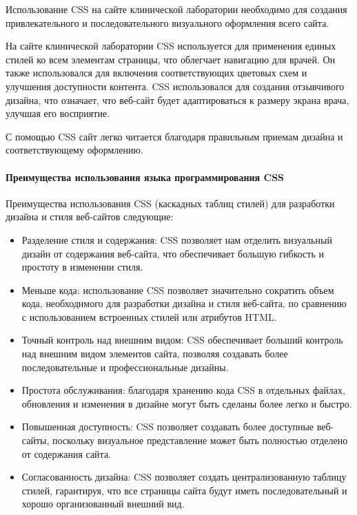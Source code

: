 Использование CSS на сайте клинической лаборатории необходимо для создания привлекательного и последовательного визуального оформления всего сайта.

На сайте клинической лаборатории CSS используется для применения единых стилей ко всем элементам страницы, что облегчает навигацию для врачей. Он также использовался для включения соответствующих цветовых схем и улучшения доступности контента. CSS использовался для создания отзывчивого дизайна, что означает, что веб-сайт будет адаптироваться к размеру экрана врача, улучшая его восприятие.

С помощью CSS сайт легко читается благодаря правильным приемам дизайна и соответствующему оформлению.

\paragraph{Преимущества использования языка программирования CSS}

Преимущества использования CSS (каскадных таблиц стилей) для разработки дизайна и стиля веб-сайтов следующие:

\begin{itemize}
	\item Разделение стиля и содержания: CSS позволяет нам отделить визуальный дизайн от содержания веб-сайта, что обеспечивает большую гибкость и простоту в изменении стиля.
	\item Меньше кода: использование CSS позволяет значительно сократить объем кода, необходимого для разработки дизайна и стиля веб-сайта, по сравнению с использованием встроенных стилей или атрибутов HTML.
	\item Точный контроль над внешним видом: CSS обеспечивает больший контроль над внешним видом элементов сайта, позволяя создавать более последовательные и профессиональные дизайны.
	\item Простота обслуживания: благодаря хранению кода CSS в отдельных файлах, обновления и изменения в дизайне могут быть сделаны более легко и быстро.
	\item Повышенная доступность: CSS позволяет создавать более доступные веб-сайты, поскольку визуальное представление может быть полностью отделено от содержания сайта.
	\item Согласованность дизайна: CSS позволяет создать централизованную таблицу стилей, гарантируя, что все страницы сайта будут иметь последовательный и хорошо организованный внешний вид.
\end{itemize}

